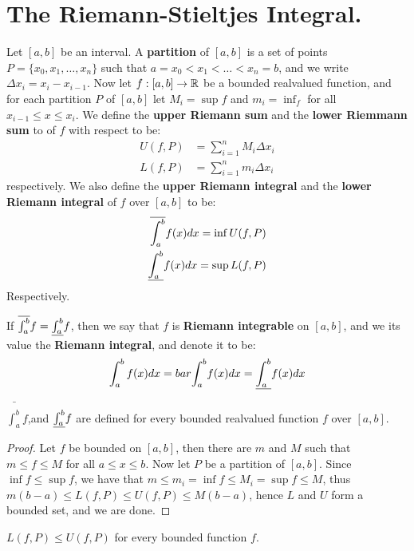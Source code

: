 
\section{The Riemann-Stieltjes Integral.}

\begin{definition}
    Let $[a,b]$ be an interval. A \textbf{partition} of $[a,b]$ is a set of
    points  $P=\{x_0,x_1, \dots, x_n\}$ such that $a=x_0<x_1< \dots <x_n=b$, and
    we write $\Delta{x_i}=x_i-x_{i-1}$. Now let  $f:[a,b] \rightarrow \mathbb{R}$ be a bounded 
    realvalued function, and for each partition $P$ of  $[a,b]$ let
    $M_i=\sup{f}$ and  $m_i=\inf_{f}$ for all  $x_{i-1} \leq x \leq x_i$. We
    define the \textbf{upper Riemann sum} and the \textbf{lower Riemmann sum} to
    of  $f$ with respect to be:
       \begin{align}
           U(f,P) &= \sum_{i=1}^{n}{M_i\Delta{x_i}} \\
           L(f,P) &= \sum_{i=1}^{n}{m_i\Delta{x_i}}
       \end{align}   
    respectively. We also define the \textbf{upper Riemann integral} and the
    \textbf{lower Riemann integral} of $f$ over  $[a,b]$ to be: 
       \begin{align}
           \overline{\int_{a}^{b}}{f(x)}dx=\inf{U(f,P)} \\
           \underline{\int_{a}^{b}}{f(x)}dx=\sup{L(f,P)}
       \end{align}
    Respectively.
    
    If $\overline{\int_{a}^{b}}{f}=\underline{\int_{a}^{b}}{f}$, then we say that  $f$ is
    \textbf{Riemann integrable} on  $[a,b]$, and we its value the
    \textbf{Riemann integral}, and denote it to be: 
        \begin{equation}
            \int_{a}^{b}{f(x)}dx=bar{\int_{a}^{b}}{f(x)}dx=\underline{\int_{a}^{b}}{f(x)}dx
        \end{equation} 
\end{definition}

\begin{lemma}\label{6.1.1}
    $\bar{\int_{a}^{b}}{f}$,and  $\underline{\int_{a}^{b}}{f}$ are defined for every
    bounded realvalued function $f$ over  $[a,b]$.
\end{lemma}
\begin{proof}
    Let $f$ be bounded on  $[a,b]$, then there are  $m$ and  $M$ such that  $m
    \leq f \leq M$ for all  $a \leq x \leq b$. Now let  $P$ be a partition of
    $[a,b]$. Since  $\inf{f} \leq \sup{f}$, we have that $m \leq m_i=\inf{f}
    \leq M_i=\sup{f} \leq M$, thus  $m(b-a) \leq L(f,P) \leq U(f,P) \leq
    M(b-a)$, hence $L$ and  $U$ form a bounded set, and we are done.
\end{proof}
\begin{corollary}
    $L(f,P) \leq U(f,P )$ for every bounded function $f$.
\end{corollary}

